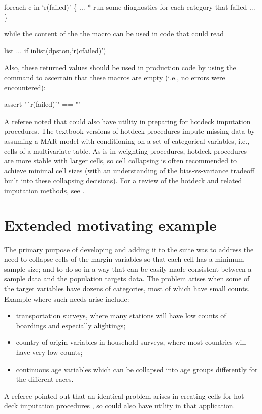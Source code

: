 \begin{stlog}
foreach c in `r(failed)' \{
    ...
    * run some diagnostics for each category that failed
    ...
\}
\end{stlog}
while the content of the the  macro can be used in code that could
read
\begin{stlog}
list ... if inlist(dpston,`r(cfailed)')
\end{stlog}
Also, these returned values should be used in production code by using the  command
\citep{gould:2003:tip3} to ascertain that these macros are empty (i.e., no errors
were encountered):
\begin{stlog}
assert "`r(failed)'" == ""
\end{stlog}



\bigskip

A referee noted that  could also have utility in preparing for hotdeck imputation procedures.
The textbook versions of hotdeck procedures impute missing data by assuming a MAR model \citep{rubin:1976}
with conditioning on a set of categorical variables, i.e., cells of a multivariate table. As is in weighting procedures,
hotdeck procedures are more stable with larger cells, so cell collapsing is often recommended to achieve
minimal cell sizes (with an understanding of the bias-vs-variance tradeoff built into these collapsing decisions).
For a review of the hotdeck and related imputation methods, see \citet{andridge:little:2010}.


\section{Extended motivating example}
\label{subsec:example}

The primary purpose of developing  and adding it to the 
suite was to address the need
to collapse cells of the margin variables so that each cell has a minimum sample size;
and to do so in a way that can be easily made consistent between a sample data
and the population targets data. The problem arises when some of the target
variables have dozens of categories, most of which have small counts.
Example where such needs arise include:
\begin{itemize}
    \item transportation surveys, where many stations will have
        low counts of boardings and especially alightings;
    \item country of origin variables in household surveys,
        where most countries will have very low counts;
    \item continuous age variables which can be collapsed into
        age groups differently for the different races.
\end{itemize}
A referee pointed out that an identical problem arises in creating cells
for hot deck imputation procedures \citet{andridge:little:2010}, 
so  could also have utility in that application.

